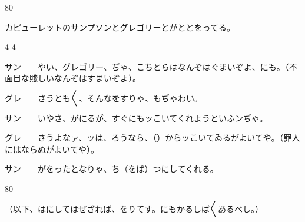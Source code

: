 \documentclass[tate,paper=b6j,jafontsize=9pt]{jlreq}
\begin{document}
\begin{azconvIndented}{8\zw}{0\zw}

カピューレットのサンプソンとグレゴリーとがととをってる。

\end{azconvIndented}
\begin{azconvIndented}{4\zw}{-4\zw}

サン　　やい、グレゴリー、ぢゃ、こちとらはなんぞはぐまいぞよ、にも。（不面目な賤しいなんぞはすまいぞよ）。

グレ　　さうとも{〳〵}、そんなをすりゃ、もぢゃわい。

サン　　いやさ、がにるが、すぐにもッこいてくれようといふンぢゃ。

グレ　　さうよなァ、ッは、ろうなら、（）からッこいてゐるがよいてや。（罪人にはならぬがよいてや）。

サン　　がをったとなりゃ、ち（をば）つにしてくれる。

\end{azconvIndented}
\begin{azconvIndented}{8\zw}{0\zw}

（以下、はにしてはぜざれば、をりてす。にもかるしば{〳〵}あるべし。）

\end{azconvIndented}
\end{document}
